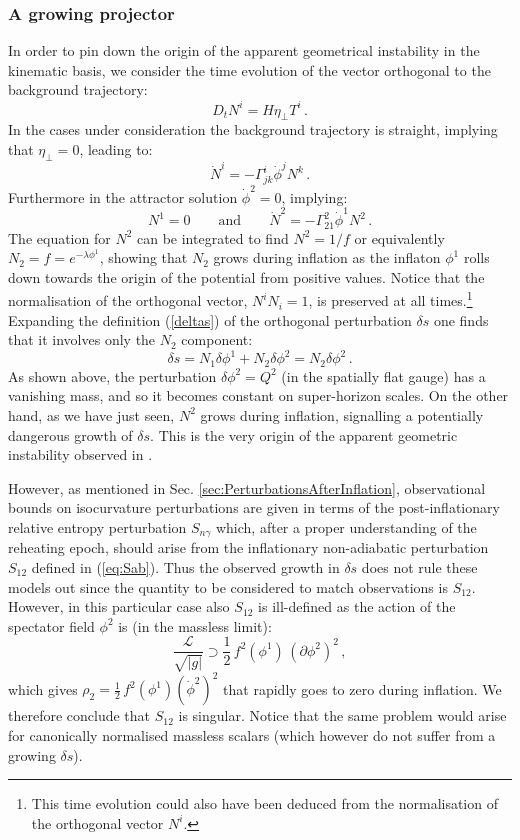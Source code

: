 \documentclass[a4paper,11pt]{article}
\def\be{\begin{equation}}
\def\ee{\end{equation}}
\newcommand{\mc}{\mathcal}
\begin{document}
\subsubsection*{A growing projector}

In order to pin down the origin of the apparent geometrical instability in the kinematic basis, we consider the time evolution of the vector orthogonal to the background trajectory: 
\be
D_t N^i=H \eta_\perp T^i\,.
\ee
In the cases under consideration the background trajectory is straight, implying that $\eta_\perp=0$, leading to:
\be
\dot N^i =-\Gamma^i_{jk}\dot{\phi}^j N^k\,.
\ee
Furthermore in the attractor solution $\dot\phi^2=0$, implying:
\be
N^1=0\qquad\text{and}\qquad\dot{N}^2= - \Gamma^2_{21} \dot\phi^1 N^2\,.
\ee
The equation for $N^2$ can be integrated to find $N^2=1/f $ or equivalently $N_2=f=e^{-\lambda \phi^1}$, showing that $N_2$ grows during inflation as the inflaton $\phi^1$ rolls down towards the origin of the potential from positive values. Notice that the normalisation of the orthogonal vector, $N^i N_i=1$,  is preserved at all times.\footnote{This time evolution could also have been deduced from the normalisation of the orthogonal vector $N^i$.} Expanding the definition (\ref{deltas}) of the orthogonal perturbation $\delta s$ one finds that it involves only the $N_2$ component:
\be
\delta s = N_1 \delta\phi^1+N_2 \delta\phi^2= N_2 \delta\phi^2\,.
\ee
As shown above, the perturbation $\delta\phi^2=Q^2$ (in the spatially flat gauge) has a vanishing mass, and so it becomes constant on super-horizon scales. On the other hand, as we have just seen, $N^2$ grows during inflation, signalling a potentially dangerous growth of $\delta s$. This is the very origin of the apparent geometric instability observed in \cite{Cicoli:2018ccr,Cicoli:2019ulk}.

However, as mentioned in Sec. \ref{sec:PerturbationsAfterInflation}, observational bounds on isocurvature perturbations are given in terms of the post-inflationary relative entropy perturbation $S_{n\gamma}$ which, after a proper understanding of the reheating epoch, should arise from the inflationary non-adiabatic perturbation $S_{12}$ defined in (\ref{eq:Sab}). Thus the observed growth in $\delta s$ does not rule these models out since the quantity to be considered to match observations is $S_{12}$. However, in this particular case also $S_{12}$ is ill-defined as the action of the spectator field $\phi^2$ is (in the massless limit): 
\be
\frac{\mc{L}}{\sqrt{|g|}}\supset\frac12\,f^2(\phi^1)\, (\partial \phi^2)^2\,,
\ee
which gives $\rho_2=\frac12 \,f^2(\phi^1) (\dot\phi^2)^2$ that rapidly goes to zero during inflation. We therefore conclude that $S_{12}$ is singular. Notice that the same problem would arise for canonically normalised massless scalars (which however do not suffer from a growing $\delta s$). 
\end{document}
